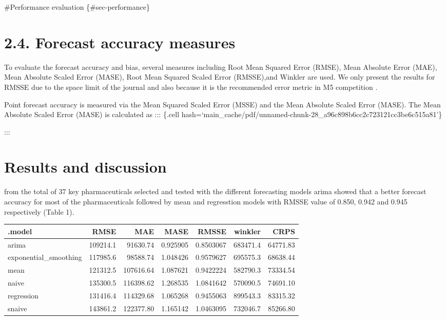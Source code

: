 \documentclass[
  authoryear,
  preprint,
  3p]{elsarticle}
\begin{document}
\#Performance evaluation \{\#sec-performance\}

\hypertarget{forecast-accuracy-measures}{%
\section{2.4. Forecast accuracy
measures}\label{forecast-accuracy-measures}}

To evaluate the forecast accuracy and bias, several measures including
Root Mean Squared Error (RMSE), Mean Absolute Error (MAE), Mean Absolute
Scaled Error (MASE), Root Mean Squared Scaled Error (RMSSE),and Winkler
are used. We only present the results for RMSSE due to the space limit
of the journal and also because it is the recommended error metric in M5
competition \citep{makridakis2022m5}.

Point forecast accuracy is measured via the Mean Squared Scaled Error
(MSSE) and the Mean Absolute Scaled Error (MASE). The Mean Absolute
Scaled Error (MASE)
\citep[hyndman2018forecasting,\citet{article}hyndman2006another,]{book}
is calculated as ::: \{.cell
hash=`main\_cache/pdf/unnamed-chunk-28\_a96c898b6cc2c723121cc3be6c515a81'\}

:::

\hypertarget{sec-results}{%
\section{Results and discussion}\label{sec-results}}

from the total of 37 key pharmaceuticals selected and tested with the
different forecasting models arima showed that a better forecast
accuracy for most of the pharmaceuticals followed by mean and
regresstion models with RMSSE value of 0.850, 0.942 and 0.945
respectively (Table 1).

\begin{table}[!h]
\centering
\begin{tabular}[t]{lrrrrrr}
\toprule
.model & RMSE & MAE & MASE & RMSSE & winkler & CRPS\\
\midrule
arima & 109214.1 & 91630.74 & 0.925905 & 0.8503067 & 683471.4 & 64771.83\\
exponential_smoothing & 117985.6 & 98588.74 & 1.048426 & 0.9579627 & 695575.3 & 68638.44\\
mean & 121312.5 & 107616.64 & 1.087621 & 0.9422224 & 582790.3 & 73334.54\\
naive & 135300.5 & 116398.62 & 1.268535 & 1.0841642 & 570090.5 & 74691.10\\
regression & 131416.4 & 114329.68 & 1.065268 & 0.9455063 & 899543.3 & 83315.32\\
\addlinespace
snaive & 143861.2 & 122377.80 & 1.165142 & 1.0463095 & 732046.7 & 85266.80\\
\bottomrule
\end{tabular}
\end{table}
\end{document}
